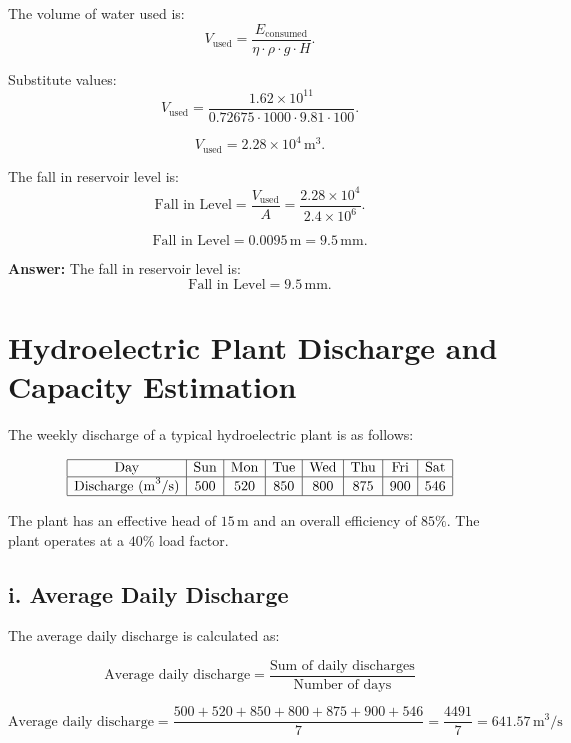 \documentclass[12pt]{article}
\begin{document}
  The volume of water used is:
  \[
  V_{\text{used}} = \frac{E_{\text{consumed}}}{\eta \cdot \rho \cdot g \cdot H}.
  \]
  
  Substitute values:
  \[
  V_{\text{used}} = \frac{1.62 \times 10^{11}}{0.72675 \cdot 1000 \cdot 9.81 \cdot 100}.
  \]
  
  \[
  V_{\text{used}} = 2.28 \times 10^4 \, \text{m}^3.
  \]
  
  The fall in reservoir level is:
  \[
  \text{Fall in Level} = \frac{V_{\text{used}}}{A} = \frac{2.28 \times 10^4}{2.4 \times 10^6}.
  \]
  
  \[
  \text{Fall in Level} = 0.0095 \, \text{m} = 9.5 \, \text{mm}.
  \]
  
  \textbf{Answer:} The fall in reservoir level is:
  \[
  \text{Fall in Level} = 9.5 \, \text{mm}.\]
	
	
	
	\section*{Hydroelectric Plant Discharge and Capacity Estimation}
	
	The weekly discharge of a typical hydroelectric plant is as follows:
	
	\[
	\begin{array}{|c|c|c|c|c|c|c|c|}
		\hline
		\text{Day} & \text{Sun} & \text{Mon} & \text{Tue} & \text{Wed} & \text{Thu} & \text{Fri} & \text{Sat} \\
		\hline
		\text{Discharge (m}^3/\text{s}\text{)} & 500 & 520 & 850 & 800 & 875 & 900 & 546 \\
		\hline
	\end{array}
	\]
	
	The plant has an effective head of \( 15 \, \text{m} \) and an overall efficiency of \( 85\% \). The plant operates at a \( 40\% \) load factor.
	
	\subsection*{i. Average Daily Discharge}
	
	The average daily discharge is calculated as:
	
	\[
	\text{Average daily discharge} = \frac{\text{Sum of daily discharges}}{\text{Number of days}}
	\]
	
	\[
	\text{Average daily discharge} = \frac{500 + 520 + 850 + 800 + 875 + 900 + 546}{7} = \frac{4491}{7} = 641.57 \, \text{m}^3/\text{s}
	\]
	
\end{document}
